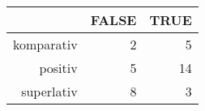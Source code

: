 \begin{tabular}{rrr}
  \hline
 & FALSE & TRUE \\ 
  \hline
komparativ & 2 & 5 \\ 
  positiv & 5 & 14 \\ 
  superlativ & 8 & 3 \\ 
   \hline
\end{tabular}
